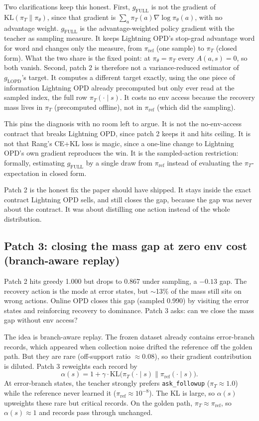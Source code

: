 \documentclass[11pt]{article}
\newcommand{\code}[1]{\texttt{#1}}
\begin{document}
Two clarifications keep this honest. First, $g_{\mathrm{FULL}}$ is not
the gradient of $\mathrm{KL}(\pi_T\|\pi_\theta)$, since that gradient is
$\sum_a \pi_T(a)\nabla\log\pi_\theta(a)$, with no advantage weight.
$g_{\mathrm{FULL}}$ is the advantage-weighted policy gradient with the teacher as
sampling measure. It keeps Lightning OPD's stop-grad advantage word for word and changes
only the measure, from $\pi_{\mathrm{ref}}$ (one sample) to $\pi_T$ (closed form).
What the two share is the fixed point: at $\pi_\theta = \pi_T$ every $A(a,s)=0$, so
both vanish. Second, patch 2 is therefore not a variance-reduced estimator of
$g_{\mathrm{LOPD}}$'s target. It computes a different target exactly, using
the one piece of information Lightning OPD already precomputed but only ever read at
the sampled index, the full row $\pi_T(\cdot\mid s)$. It costs no env access
because the recovery mass lives in $\pi_T$ (precomputed offline), not in
$\pi_{\mathrm{ref}}$ (which did the sampling).

This pins the diagnosis with no room left to argue. It is not the no-env-access
contract that breaks Lightning OPD, since patch 2 keeps it and hits ceiling. It is not
that Rang's CE+KL loss is magic, since a one-line change to Lightning OPD's own gradient
reproduces the win. It is the sampled-action restriction: formally, estimating
$g_{\mathrm{FULL}}$ by a single draw from $\pi_{\mathrm{ref}}$ instead of
evaluating the $\pi_T$-expectation in closed form.

Patch 2 is the honest fix the paper should have shipped. It stays inside the exact
contract Lightning OPD sells, and still closes the gap, because the gap was never
about the contract. It was about distilling one action instead of the whole
distribution.

\subsection{Patch 3: closing the mass gap at zero env cost (branch-aware replay)}
\label{sec:patch3}

Patch 2 hits greedy 1.000 but drops to 0.867 under sampling, a $-0.13$ gap. The
recovery action is the mode at error states, but $\sim$13\% of the mass still
sits on wrong actions. Online OPD closes this gap (sampled 0.990) by visiting
the error states and reinforcing recovery to dominance. Patch 3 asks: can we close
the mass gap without env access?

The idea is branch-aware replay. The frozen dataset already contains
error-branch records, which appeared when collection noise drifted the reference
off the golden path. But they are rare (off-support ratio $\approx 0.08$), so their
gradient contribution is diluted. Patch 3 reweights each record by
\[
\alpha(s) = 1 + \gamma\cdot\mathrm{KL}\bigl(\pi_T(\cdot\mid s) \| \pi_{\mathrm{ref}}(\cdot\mid s)\bigr).
\]
At error-branch states, the teacher strongly prefers \code{ask\_followup}
($\pi_T \approx 1.0$) while the reference never learned it
($\pi_{\mathrm{ref}} \approx 10^{-8}$). The KL is large, so $\alpha(s)$ upweights
these rare but critical records. On the golden path, $\pi_T \approx \pi_{\mathrm{ref}}$,
so $\alpha(s) \approx 1$ and records pass through unchanged.
\end{document}
